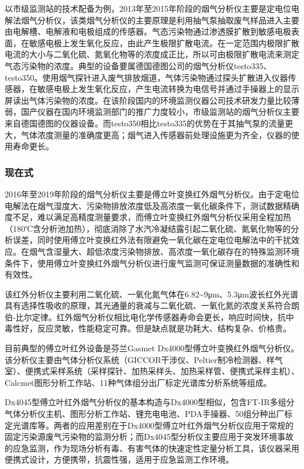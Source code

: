 \documentclass[
]{book}
\begin{document}
以市级监测站的技术配备为例，2013年至2015年阶段的烟气分析仪主要是定电位电解法烟气分析仪，该类烟气分析仪的主要原理是利用抽气泵抽取废气样品进入主要由电解槽、电解液和电极组成的传感器。气态污染物通过渗透膜扩散到敏感电极表面，在敏感电极上发生氧化反应，由此产生极限扩散电流。在一定范围内极限扩散电流的大小与二氧化硫、氮氧化物等的浓度成正比，所以可由极限扩散电流来测定气态污染物的浓度。典型的设备要属德国德图公司的烟气分析仪testo335、testo350。使用烟气探针进入废气排放烟道，气体污染物通过探头扩散进入仪器传感器，在敏感电极上发生氧化反应，产生电流转换为电信号并通过手操器上的显示屏读出气体污染物的浓度。在该阶段国内的环境监测仪器公司技术研发力量比较薄弱，国产仪器在国内环境监测部门的推广力度较小，市级监测站的烟气分析仪主要来自德国德图的仪器设备。而testo350相比testo335的优势在于其抽气泵的流量更大，气体浓度测量的准确度更高；烟气进入传感器前处理设施更为齐全，仪器的使用寿命更长。

\hypertarget{ux73b0ux5728ux5f0f}{%
\subsubsection{现在式}\label{ux73b0ux5728ux5f0f}}

2016年至2019年阶段的烟气分析仪主要是傅立叶变换红外烟气分析仪。由于定电位电解法在烟气湿度大、污染物排放浓度低及高浓度一氧化碳条件下，测试数据精确度不足，难以满足高精度测量要求，而傅立叶变换红外烟气分析仪采用全程加热（180℃含分析池加热），彻底消除了水汽冷凝结露引起二氧化硫、氮氧化物等的分析误差，同时使用傅立叶变换红外法有限避免一氧化碳在定电位电解法中的干扰效应。在烟气含湿量大、超低浓度污染物排放、高浓度一氧化碳存在的特殊监测环境条件下，使用傅立叶变换红外烟气分析仪进行废气监测可保证测量数据的准确性和有效性。

该红外分析仪主要利用二氧化硫、一氧化氮气体在6.82\textasciitilde9μm、5.3μm波长红外光谱具有选择性吸收的原理，其光通量的衰减与二氧化硫、一氧化氮的浓度关系符合朗伯-比尔定律。红外烟气分析仪相比电化学传感器寿命会更长，响应时间快，抗中毒性好，反应灵敏，性能稳定可靠。但是缺点就是功耗大、结构复杂、价格贵。

目前典型的傅立叶红外设备是芬兰Gasmet Dx4000型傅立叶变换红外烟气分析仪。该分析仪主要由气体分析仪系统（GICCOR干涉仪、Peltier制冷检测器、样气室）、便携式采样系统（采样探针、加热采样头、加热采样管、便携式采样主机）、Calcmet图形分析工作站、11种气体组分出厂标定光谱库分析系统等组成。

Dx4045型傅立叶红外烟气分析仪的基本构造与Dx4000型相似，包含FT-IR多组分气体分析仪主机、图形分析工作站、锂充电电池、PDA手操器、50组分种出厂标定光谱库等。两者的应用差别在于Dx4000型傅立叶红外烟气分析仪应用于常规的固定污染源废气污染物的监测分析；而Dx4045型分析仪主要应用于突发环境事故的应急监测，作为现场分析有毒、有害气体的快速定性定量分析工具，该仪器采用便携式设计，方便携带，抗震性强，适用于应急监测工作环境。
\end{document}
